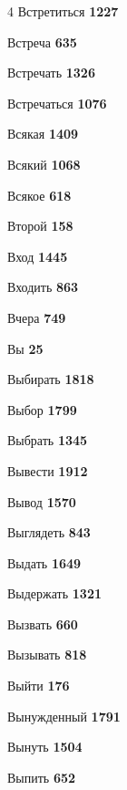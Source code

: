 \begin{multicols}{4}
\noindent Встретиться \dotfill \textbf{\color{secondary} 1227}\par
\noindent Встреча \dotfill \textbf{\color{secondary} 635}\par
\noindent Встречать \dotfill \textbf{\color{secondary} 1326}\par
\noindent Встречаться \dotfill \textbf{\color{secondary} 1076}\par
\noindent Всякая \dotfill \textbf{\color{secondary} 1409}\par
\noindent Всякий \dotfill \textbf{\color{secondary} 1068}\par
\noindent Всякое \dotfill \textbf{\color{secondary} 618}\par
\noindent Второй \dotfill \textbf{\color{secondary} 158}\par
\noindent Вход \dotfill \textbf{\color{secondary} 1445}\par
\noindent Входить \dotfill \textbf{\color{secondary} 863}\par
\noindent Вчера \dotfill \textbf{\color{secondary} 749}\par
\noindent Вы \dotfill \textbf{\color{secondary} 25}\par
\noindent Выбирать \dotfill \textbf{\color{secondary} 1818}\par
\noindent Выбор \dotfill \textbf{\color{secondary} 1799}\par
\noindent Выбрать \dotfill \textbf{\color{secondary} 1345}\par
\noindent Вывести \dotfill \textbf{\color{secondary} 1912}\par
\noindent Вывод \dotfill \textbf{\color{secondary} 1570}\par
\noindent Выглядеть \dotfill \textbf{\color{secondary} 843}\par
\noindent Выдать \dotfill \textbf{\color{secondary} 1649}\par
\noindent Выдержать \dotfill \textbf{\color{secondary} 1321}\par
\noindent Вызвать \dotfill \textbf{\color{secondary} 660}\par
\noindent Вызывать \dotfill \textbf{\color{secondary} 818}\par
\noindent Выйти \dotfill \textbf{\color{secondary} 176}\par
\noindent Вынужденный \dotfill \textbf{\color{secondary} 1791}\par
\noindent Вынуть \dotfill \textbf{\color{secondary} 1504}\par
\noindent Выпить \dotfill \textbf{\color{secondary} 652}\par

\end{multicols}

